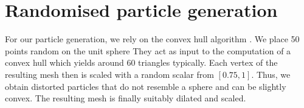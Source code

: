\section{Randomised particle generation}
\label{section:randomised-particle-generation}

For our particle generation, we rely on the convex hull algorithm
\cite{mattutis,3,5}.
We place 50 points random on the unit sphere
They act as input to the computation of a convex hull which yields around 60
triangles typically.
Each vertex of the resulting mesh then is scaled with a random scalar from
$[0.75,1]$.
Thus, we obtain distorted particles that do not resemble a sphere and can be
slightly convex.
The resulting mesh is finally suitably dilated and scaled.

